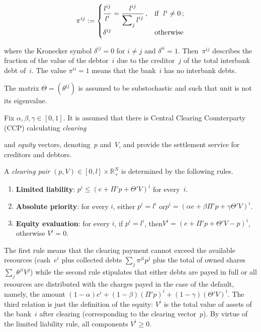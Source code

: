\begin{multicols}{2}
\vspace*{2pt}

\noindent
\begin{equation*}
\pi^{ij}:=\begin{cases}
\displaystyle\frac{\displaystyle l^{ij}\mathstrut}{\displaystyle l^i\mathstrut}=\displaystyle\frac{\displaystyle l^{ij}\mathstrut}{\displaystyle \sum\nolimits_j l^{ij}\mathstrut}\,, & \mbox{if \ }l^i\neq 0\,;\\
\delta^{ij} &  \mbox{otherwise} 
\end{cases}
\end{equation*}

\vspace*{-4pt}

\noindent
where the Kronecker symbol $\delta^{ij}=0$ for $i\neq j$ and $\delta^{ii}=1$.
Then~$\pi^{ij}$  describes the fraction of the value of the debtor~$i$ due to the creditor~$j$ of the total interbank debt of~$i$.  The value $\pi^{ii}=1$ means that 
the bank~$i$ has no interbank debts. 

The matrix $\Theta=(\theta^{ij})$ is assumed to be substochastic and such that unit is not its eigenvalue. 

 Fix $\alpha, \beta, \gamma \in [0,1]$.  
It is assumed that there is  Central Clearing Counterparty (CCP) calculating  \textit{clearing}\linebreak\vspace*{-12pt}

\pagebreak

\noindent
 and \textit{equity}  vectors, 
denoting~$p$ and~$V$, and provide  the settlement service for creditors and debtors.   

A \textit{clearing pair} $(p,V)\in [0,l]\times  \mathbb{R}^N_+$ is determined by the following rules.   
\begin{enumerate}[1.]
    \item
    {\bf Limited liability}: $p^i \leq (e + \Pi' p + \Theta' V)^i$ for every~$i$.
    \item
    {\bf Absolute priority}: for every $i$,
    either $p^i = l^i$ or\linebreak $p^i = \left(\alpha e + \beta \Pi' p + \gamma \Theta' V\right)^i$. 
    \item
    {\bf Equity evaluation}: for every $i$, if $p^i = l^i$, then\linebreak $V^i = \left(e + \Pi' p + \Theta' V - p\right)^i$, otherwise $V^i = 0$.
\end{enumerate}

The  first rule means that the clearing payment cannot exceed the available resources 
(cash~$e^i$ plus collected debts $\sum\nolimits_j \pi^{ji}p^j$ plus the total of owned shares $\sum\nolimits_j \theta^{ji} V^j$) while
the second rule stipulates that either debts are payed in full or all resources are distributed with the charges payed in the case of the default, namely, the amount 
$(1-\alpha)e^i + (1-\beta) \left(\Pi'p\right)^i+(1- \gamma)\left( \Theta' V\right)^i.
$ 
The third relation is just the definition of the equity:  $V^i$ is the total value of  assets of the bank~$i$ after clearing  (corresponding to the clearing vector~$p$). 
By virtue of the limited liability rule, all components $V^i\ge 0$. 


\end{multicols}
